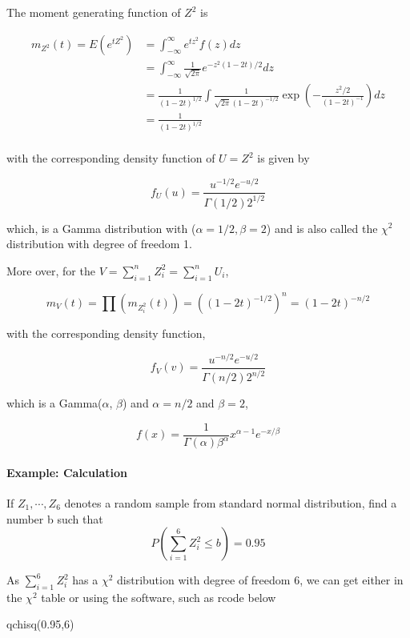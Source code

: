\documentclass[
  letterpaper,
  DIV=11,
  numbers=noendperiod]{scrreprt}
\let\oldparagraph\paragraph
\renewcommand{\paragraph}[1]{\oldparagraph{#1}\mbox{}}
\newenvironment{Shaded}{\begin{snugshade}}{\end{snugshade}}
\newcommand{\DecValTok}[1]{\textcolor[rgb]{0.68,0.00,0.00}{#1}}
\newcommand{\FloatTok}[1]{\textcolor[rgb]{0.68,0.00,0.00}{#1}}
\newcommand{\FunctionTok}[1]{\textcolor[rgb]{0.28,0.35,0.67}{#1}}
\newcommand{\NormalTok}[1]{\textcolor[rgb]{0.00,0.23,0.31}{#1}}
\theoremstyle{plain}
\theoremstyle{remark}
\begin{document}
The moment generating function of \(Z^2\) is

\[
\begin{aligned}
m_{Z^2}(t)=E(e^{tZ^2})&=\int_{-\infty}^\infty e^{tz^2}f(z)dz\\
&= \int_{-\infty}^{\infty} \frac{1}{\sqrt{2\pi}} e^{-z^2(1-2t)/2}dz\\
&=\frac{1}{(1-2t)^{1/2}} \int\frac{1}{\sqrt{2\pi}(1-2t)^{-1/2}}\exp\left(-\frac{z^2/2}{(1-2t)^{-1}}\right)dz \\
&=\frac{1}{(1-2t)^{1/2}} \\
\end{aligned}
\]

with the corresponding density function of \(U=Z^2\) is given by

\[
f_U(u)=\frac{u^{-1/2}e^{-u/2}}{\Gamma(1/2)2^{1/2}}
\]

which, is a Gamma distribution with (\(\alpha=1/2, \beta=2\)) and is
also called the \(\chi^2\) distribution with degree of freedom 1.

More over, for the \(V=\sum_{i=1}^n Z_i^2=\sum_{i=1}^nU_i\),

\[
m_V(t)=\prod(m_{Z_i^2}(t))=\left((1-2t)^{-1/2}\right)^n=(1-2t)^{-n/2}
\]

with the corresponding density function,

\[
f_V(v)=\frac{u^{-n/2}e^{-u/2}}{\Gamma(n/2)2^{n/2}}
\]

which is a Gamma(\(\alpha\), \(\beta\)) and \(\alpha=n/2\) and
\(\beta=2\),

\[
f(x)=\frac{1}{\Gamma(\alpha)\beta^\alpha}x^{\alpha-1}e^{-x/\beta}
\]

\hypertarget{example-calculation-1}{%
\paragraph{Example: Calculation}\label{example-calculation-1}}

If \(Z_1,\cdots,Z_6\) denotes a random sample from standard normal
distribution, find a number b such that \[
P(\sum_{i=1}^6Z^2_i\leq b)=0.95
\]

As \(\sum_{i=1}^6 Z^2_i\) has a \(\chi^2\) distribution with degree of
freedom 6, we can get either in the \(\chi^2\) table or using the
software, such as rcode below

\begin{Shaded}
\begin{Highlighting}[]
\FunctionTok{qchisq}\NormalTok{(}\FloatTok{0.95}\NormalTok{,}\DecValTok{6}\NormalTok{)}
\end{Highlighting}
\end{Shaded}
\end{document}
